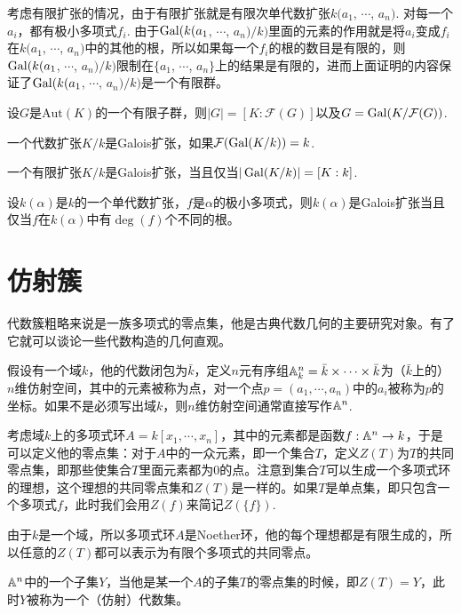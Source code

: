考虑有限扩张的情况，由于有限扩张就是有限次单代数扩张$k(a_1$, $\cdots$, $a_n)$. 对每一个$a_i$，都有极小多项式$f_i$. 由于$\operatorname{Gal}(k(a_1$, $\cdots$, $a_n)/k)$里面的元素的作用就是将$a_i$变成$f_i$在$k(a_1$, $\cdots$, $a_n)$中的其他的根，所以如果每一个$f_i$的根的数目是有限的，则$\operatorname{Gal}(k(a_1$, $\cdots$, $a_n)/k)$限制在$\{a_1$, $\cdots$, $a_n\}$上的结果是有限的，进而上面证明的内容保证了$\operatorname{Gal}(k(a_1$, $\cdots$, $a_n)/k)$是一个有限群。

\begin{pro}
设$G$是$\mathrm{Aut}(K)$的一个有限子群，则$|G|=[K:\mathcal{F}(G)]$以及$G=\operatorname{Gal}(K/\mathcal{F}(G))$.
\end{pro}

\para 一个代数扩张$K/k$是Galois扩张，如果$\mathcal{F}(\operatorname{Gal}(K/k))=k$.

\begin{pro}
一个有限扩张$K/k$是Galois扩张，当且仅当$|\operatorname{Gal}(K/k)|=[K:k]$.
\end{pro}

\begin{pro}
设$k(\alpha)$是$k$的一个单代数扩张，$f$是$\alpha$的极小多项式，则$k(\alpha)$是Galois扩张当且仅当$f$在$k(\alpha)$中有$\deg(f)$个不同的根。
\end{pro}

\section{仿射簇}
\label{variety}

代数簇粗略来说是一族多项式的零点集，他是古典代数几何的主要研究对象。有了它就可以谈论一些代数构造的几何直观。

\para 假设有一个域$k$，他的代数闭包为$\bar{k}$，定义$n$元有序组$\mathbb{A}^n_k=\bar{k}\times \cdots \times \bar{k}$为（$\bar{k}$上的）$n$维仿射空间，其中的元素被称为点，对一个点$p=(a_1,\cdots ,a_n)$中的$a_i$被称为$p$的坐标。如果不是必须写出域$k$，则$n$维仿射空间通常直接写作$\mathbb{A}^n$.

考虑域$k$上的多项式环$A=k[x_1,\cdots ,x_n]$，其中的元素都是函数$f:\mathbb{A}^n\to k$，于是可以定义他的零点集：对于$A$中的一众元素，即一个集合$T$，定义$Z(T)$为$T$的共同零点集，即那些使集合$T$里面元素都为$0$的点。注意到集合$T$可以生成一个多项式环的理想，这个理想的共同零点集和$Z(T)$是一样的。如果$T$是单点集，即只包含一个多项式$f$，此时我们会用$Z(f)$来简记$Z(\{f\})$.

由于$k$是一个域，所以多项式环$A$是Noether环，他的每个理想都是有限生成的，所以任意的$Z(T)$都可以表示为有限个多项式的共同零点。

\para $\mathbb{A}^n$中的一个子集$Y$，当他是某一个$A$的子集$T$的零点集的时候，即$Z(T)=Y$，此时$Y$被称为一个（仿射）代数集。

